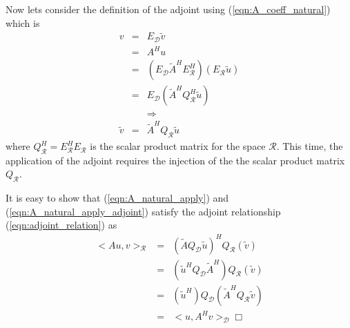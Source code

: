 Now lets consider the definition of the adjoint using (\ref{eqn:A_coeff_natural}) which is
%
\begin{eqnarray}
v
& = & E_{\mathcal{D}} \tilde{v} \nonumber \\
& = & A^H u \nonumber \\
& = & ( E_{\mathcal{D}} \tilde{A}^H E_{\mathcal{R}}^H ) ( E_{\mathcal{R}} \tilde{u} ) \nonumber \\
& = & E_{\mathcal{D}} ( \tilde{A}^H Q_{\mathcal{R}}^H \tilde{u} ) \nonumber \\
&  & \Rightarrow \nonumber \\
\tilde{v} & = & \tilde{A}^H Q_{\mathcal{R}} \tilde{u}
\label{eqn:A_natural_apply_adjoint}
\end{eqnarray}
%
where $Q_{\mathcal{R}}^H = E_{\mathcal{R}}^H E_{\mathcal{R}}$ is the scalar
product matrix for the space $\mathcal{R}$.  This time, the application of the
adjoint requires the injection of the the scalar product matrix
$Q_{\mathcal{R}}$.

It is easy to show that (\ref{eqn:A_natural_apply}) and
(\ref{eqn:A_natural_apply_adjoint}) satisfy the adjoint relationship
(\ref{eqn:adjoint_relation}) as
%
\begin{eqnarray}
<A u, v>_{\mathcal{R}}
& = & (\tilde{A} Q_{\mathcal{D}} \tilde{u} )^H Q_{\mathcal{R}} (\tilde{v}) \nonumber \\
& = & ( \tilde{u}^H Q_{\mathcal{D}} \tilde{A}^H ) Q_{\mathcal{R}} (\tilde{v}) \nonumber \\
& = & (\tilde{u}^H ) Q_{\mathcal{D}} ( \tilde{A}^H Q_{\mathcal{R}} \tilde{v}) \nonumber \\
& = & <u, A^H v>_{\mathcal{D}} \Box
\label{eqn:adjoint_relation_proved}
\end{eqnarray}
%

